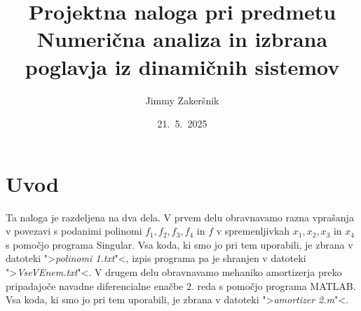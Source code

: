 \documentclass[a4paper, 10pt]{article}
\title{Projektna naloga pri predmetu Numerična analiza in izbrana poglavja iz dinamičnih sistemov}
\date{21.~5.~2025}
\author{Jimmy Zakeršnik}
\begin{document}
	\maketitle
	\thispagestyle{empty}
	\newpage
	\section{Uvod}
		Ta naloga je razdeljena na dva dela. V prvem delu obravnavamo razna vprašanja v povezavi s podanimi polinomi $f_1, f_2, f_3, f_4$ in $f$ v spremenljivkah $x_1, x_2, x_3$ in $x_4$ s pomočjo programa Singular. Vsa koda, ki smo jo pri tem uporabili, je zbrana v datoteki ">\emph{polinomi 1.txt}"<, izpis programa pa je shranjen v datoteki ">\emph{VseVEnem.txt}"<. V drugem delu obravnavamo mehaniko amortizerja preko pripadajoče navadne diferencialne enačbe $2.$ reda s pomočjo programa MATLAB. Vsa koda, ki smo jo pri tem uporabili, je zbrana v datoteki ">\emph{amortizer 2.m}"<.
\end{document}
